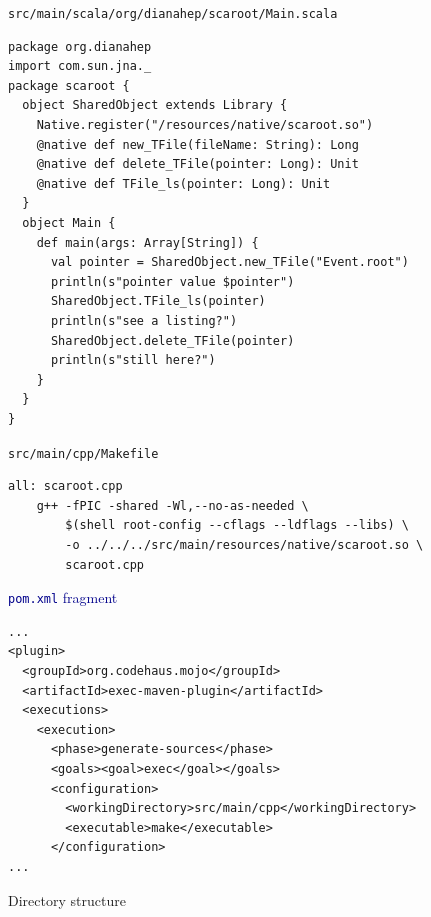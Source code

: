 \documentclass{beamer}
\begin{document}
\begin{frame}[fragile]{\tt src/main/scala/org/dianahep/scaroot/Main.scala}
\small
\begin{verbatim}
package org.dianahep
import com.sun.jna._
package scaroot {
  object SharedObject extends Library {
    Native.register("/resources/native/scaroot.so")
    @native def new_TFile(fileName: String): Long
    @native def delete_TFile(pointer: Long): Unit
    @native def TFile_ls(pointer: Long): Unit
  }
  object Main {
    def main(args: Array[String]) {
      val pointer = SharedObject.new_TFile("Event.root")
      println(s"pointer value $pointer")
      SharedObject.TFile_ls(pointer)
      println(s"see a listing?")
      SharedObject.delete_TFile(pointer)
      println(s"still here?")
    }
  }
}
\end{verbatim}
\end{frame}

\begin{frame}[fragile]{\tt src/main/cpp/Makefile}
\small
\begin{verbatim}
all: scaroot.cpp
    g++ -fPIC -shared -Wl,--no-as-needed \
        $(shell root-config --cflags --ldflags --libs) \
        -o ../../../src/main/resources/native/scaroot.so \
        scaroot.cpp
\end{verbatim}

\vfill
\hspace{-0.83 cm} \textcolor{darkblue}{\Large {\tt pom.xml} fragment}
\begin{verbatim}
...
<plugin>
  <groupId>org.codehaus.mojo</groupId>
  <artifactId>exec-maven-plugin</artifactId>
  <executions>
    <execution>
      <phase>generate-sources</phase>
      <goals><goal>exec</goal></goals>
      <configuration>
        <workingDirectory>src/main/cpp</workingDirectory>
        <executable>make</executable>
      </configuration>
...
\end{verbatim}
\end{frame}

\begin{frame}[fragile]{Directory structure}
\small
{}
\end{frame}
\end{document}
